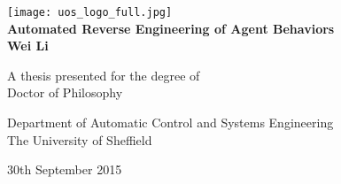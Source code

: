 \begin{titlepage}
\begin{center}


\texttt{[image: uos\_logo\_full.jpg]}~\\[3.0cm]

\textsf{{\Huge \bfseries Automated Reverse Engineering of Agent Behaviors}}~\\[1cm]

\textsf{{\Large \bfseries Wei Li}}~\\[3.5cm]


%

	\vspace{1.0cm}
	
	{\Large A thesis presented for the degree of\\Doctor of Philosophy}
	
	\vspace{1.0cm}
	
	
	{\Large Department of Automatic Control and Systems Engineering}\\
	\vspace{0.2cm}
	{\Large The University of Sheffield}\\
	
	\vfill
	
	{\Large 30th September 2015}
	

\end{center}
\end{titlepage}

